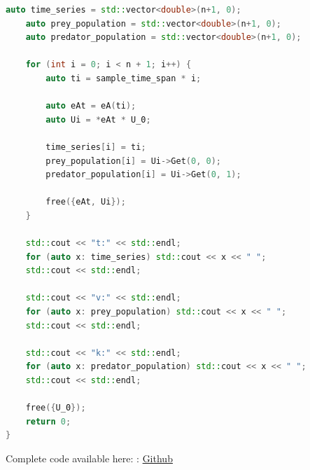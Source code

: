 \documentclass{article}
\begin{document}
\begin{lstlisting}[language=c++]
    auto time_series = std::vector<double>(n+1, 0);
    auto prey_population = std::vector<double>(n+1, 0);
    auto predator_population = std::vector<double>(n+1, 0);

    for (int i = 0; i < n + 1; i++) {
        auto ti = sample_time_span * i;

        auto eAt = eA(ti);
        auto Ui = *eAt * U_0;

        time_series[i] = ti;
        prey_population[i] = Ui->Get(0, 0);
        predator_population[i] = Ui->Get(0, 1);

        free({eAt, Ui});
    }

    std::cout << "t:" << std::endl;
    for (auto x: time_series) std::cout << x << " ";
    std::cout << std::endl;

    std::cout << "v:" << std::endl;
    for (auto x: prey_population) std::cout << x << " ";
    std::cout << std::endl;

    std::cout << "k:" << std::endl;
    for (auto x: predator_population) std::cout << x << " ";
    std::cout << std::endl;

    free({U_0});
    return 0;
}
\end{lstlisting}

Complete code available here: : \href{https://github.com/Dartt0n/Least-Square-Approximation-Cpp}{Github}
\end{document}
